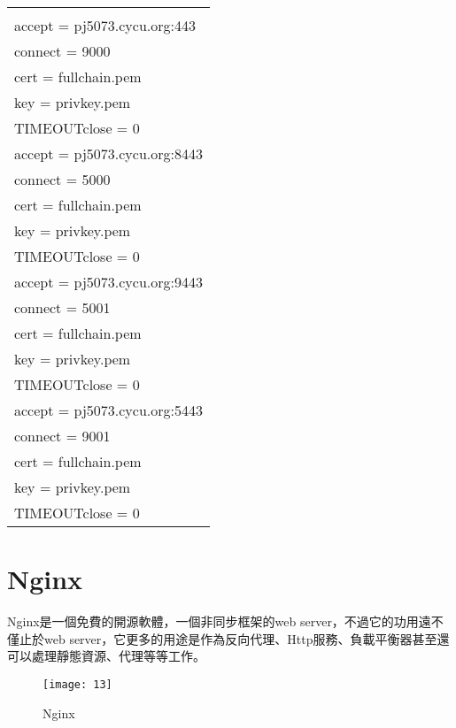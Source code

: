 \par
\begin{center}
\begin{tabular}{||p{15cm}|} %
\hline
[https]
\\
accept  = pj5073.cycu.org:443
\\
connect = 9000
\\
cert = fullchain.pem
\\
key = privkey.pem
\\
TIMEOUTclose = 0
\\ 
accept = pj5073.cycu.org:8443
\\
connect = 5000
\\
cert = fullchain.pem
\\
key = privkey.pem
\\
TIMEOUTclose = 0
\\
accept = pj5073.cycu.org:9443
\\
connect = 5001
\\
cert = fullchain.pem
\\
key = privkey.pem
\\
TIMEOUTclose = 0
\\
accept = pj5073.cycu.org:5443
\\
connect = 9001
\\
cert = fullchain.pem
\\
key = privkey.pem
\\
TIMEOUTclose = 0
\\
\hline
\end{tabular}
\end{center}
\par

\renewcommand{\baselinestretch}{20} %
\section{Nginx}
\par
\renewcommand{\baselinestretch}{1} %
\twelve \qquad Nginx是一個免費的開源軟體，一個非同步框架的web server，不過它的功用遠不僅止於web server，它更多的用途是作為反向代理、Http服務、負載平衡器甚至還可以處理靜態資源、代理等等工作。
\\
\par
\renewcommand{\baselinestretch}{1.7} %
\begin{figure}[hbt!]
\begin{center}
\texttt{[image: 13]}
\caption{\large Nginx}\label{fig.Nginx}
\end{center}
\end{figure}
\par


